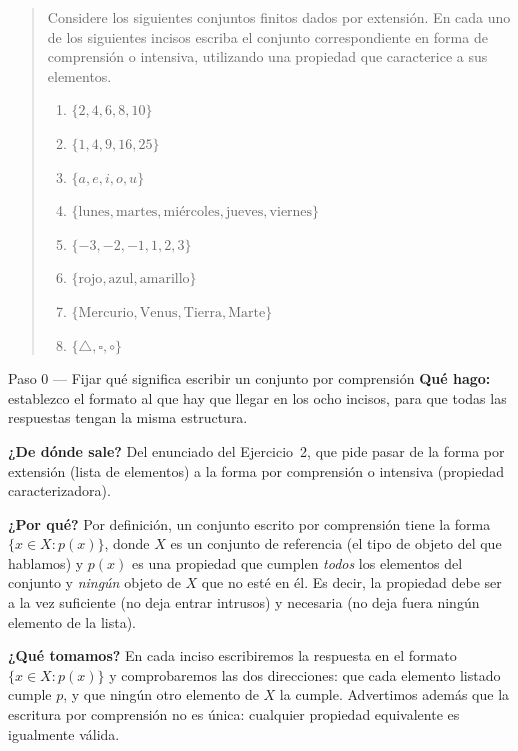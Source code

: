 \documentclass[11pt]{article}
\begin{document}
\begin{quote}
Considere los siguientes conjuntos finitos dados por extensión. En cada uno de los siguientes
incisos escriba el conjunto correspondiente en forma de comprensión o intensiva, utilizando una
propiedad que caracterice a sus elementos.

\begin{enumerate}[label=(\alph*),leftmargin=*]
	\item $\{2,4,6,8,10\}$
	\item $\{1,4,9,16,25\}$
	\item $\{a,e,i,o,u\}$
	\item $\{\text{lunes},\text{martes},\text{miércoles},\text{jueves},\text{viernes}\}$
	\item $\{-3,-2,-1,1,2,3\}$
	\item $\{\text{rojo},\text{azul},\text{amarillo}\}$
	\item $\{\text{Mercurio},\text{Venus},\text{Tierra},\text{Marte}\}$
	\item $\{\triangle,\square,\circ\}$
\end{enumerate}
\end{quote}

\begin{paso}{Paso 0 --- Fijar qué significa escribir un conjunto por comprensión}
\textbf{Qué hago:} establezco el formato al que hay que llegar en los ocho incisos, para que
todas las respuestas tengan la misma estructura.

\textbf{¿De dónde sale?} Del enunciado del Ejercicio~2, que pide pasar de la forma por
extensión (lista de elementos) a la forma por comprensión o intensiva (propiedad
caracterizadora).

\textbf{¿Por qué?} Por definición, un conjunto escrito por comprensión tiene la forma
$\{x\in X : p(x)\}$, donde $X$ es un conjunto de referencia (el tipo de objeto del que
hablamos) y $p(x)$ es una propiedad que cumplen \emph{todos} los elementos del conjunto y
\emph{ningún} objeto de $X$ que no esté en él. Es decir, la propiedad debe ser a la vez
suficiente (no deja entrar intrusos) y necesaria (no deja fuera ningún elemento de la lista).

\textbf{¿Qué tomamos?} En cada inciso escribiremos la respuesta en el formato
$\{x\in X : p(x)\}$ y comprobaremos las dos direcciones: que cada elemento listado cumple
$p$, y que ningún otro elemento de $X$ la cumple. Advertimos además que la escritura por
comprensión no es única: cualquier propiedad equivalente es igualmente válida.
\end{paso}
\end{document}
